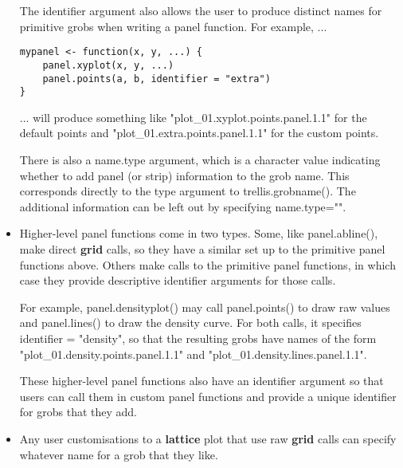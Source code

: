 \documentclass[10pt]{article}
\newcommand{\pkg}[1]{{\bfseries #1}}
\newcommand{\code}[1]{{\ttfamily #1}}
\begin{document}
\begin{itemize}
The \code{identifier} argument also allows the user to produce
distinct names for primitive grobs when writing a panel function.
For example, ...

\begin{verbatim}
mypanel <- function(x, y, ...) {
    panel.xyplot(x, y, ...)
    panel.points(a, b, identifier = "extra")
}
\end{verbatim}

... will produce something like \code{"plot\_01.xyplot.points.panel.1.1"}
for the default points and \code{"plot\_01.extra.points.panel.1.1"} for
the custom points.

There is also a \code{name.type} argument, which is a character value
indicating whether to add panel (or strip) information to the grob name.
This corresponds directly to the \code{type} argument to 
\code{trellis.grobname()}.
The additional information can be left out by specifying \code{name.type=""}.

\item
Higher-level panel functions come in two types.  Some, 
like \code{panel.abline()}, make direct \pkg{grid} calls, so they 
have a similar set up to the primitive panel functions above.
Others make calls to the primitive panel functions, in which case they
provide descriptive \code{identifier} arguments for those calls.

For example, \code{panel.densityplot()} may call \code{panel.points()} to
draw raw values and \code{panel.lines()} to draw the density curve.
For both calls, it specifies
\code{identifier = "density"}, so that the resulting grobs have names
of the form \code{"plot\_01.density.points.panel.1.1"} and
\code{"plot\_01.density.lines.panel.1.1"}.

These higher-level panel functions also have an \code{identifier} argument
so that users can call them in custom panel functions and provide
a unique identifier for grobs that they add.

\item 
Any user customisations to a \pkg{lattice} plot 
that use raw \pkg{grid} calls can specify whatever
\code{name} for a grob that they like.

\end{itemize}
\end{document}
